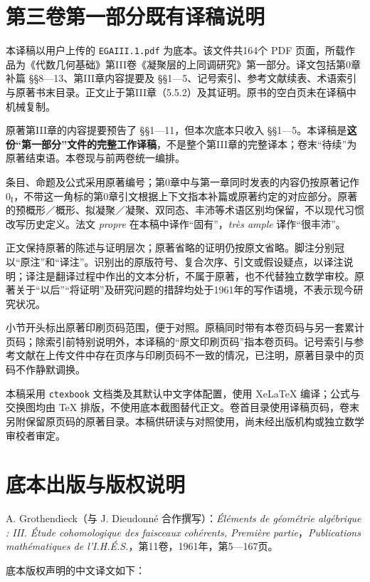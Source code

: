\chapter*{第三卷第一部分既有译稿说明}
本译稿以用户上传的 \texttt{EGAIII.1.pdf} 为底本。该文件共164个 PDF 页面，所载作品为《代数几何基础》第III卷《凝聚层的上同调研究》第一部分。译文包括第0章补篇 §§8—13、第III章内容提要及 §§1—5、记号索引、参考文献续表、术语索引与原著书末目录。正文止于第III章（5.5.2）及其证明。原书的空白页未在译稿中机械复制。

原著第III章的内容提要预告了 §§1—11，但本次底本只收入 §§1—5。本译稿是\textbf{这份“第一部分”文件的完整工作译稿}，不是整个第III章的完整译本；卷末“待续”为原著结束语。本卷现与前两卷统一编排。

条目、命题及公式采用原著编号；第0章中与第一章同时发表的内容仍按原著记作 $0_{\mathrm I}$，不带这一角标的第0章引文根据上下文指本补篇或原著约定的对应部分。原著的预概形／概形、拟凝聚／凝聚、双同态、丰沛等术语区别均保留，不以现代习惯改写历史定义。法文 \textit{propre} 在本稿中译作“固有”，\textit{très ample} 译作“很丰沛”。

正文保持原著的陈述与证明层次；原著省略的证明仍按原文省略。脚注分别冠以“原注”和“译注”。识别出的原版符号、复合次序、引文或假设疑点，以译注说明；译注是翻译过程中作出的文本分析，不属于原著，也不代替独立数学审校。原著关于“以后”“将证明”及研究问题的措辞均处于1961年的写作语境，不表示现今研究状况。

小节开头标出原著印刷页码范围，便于对照。原稿同时带有本卷页码与另一套累计页码；除索引前特别说明外，本译稿的“原文印刷页码”指本卷页码。记号索引与参考文献在上传文件中存在页序与印刷页码不一致的情况，已注明，原著目录中的页码不作静默调换。

本稿采用 \texttt{ctexbook} 文档类及其默认中文字体配置，使用 XeLaTeX 编译；公式与交换图均由 TeX 排版，不使用底本截图替代正文。卷首目录使用译稿页码，卷末另附保留原页码的原著目录。本稿供研读与对照使用，尚未经出版机构或独立数学审校者审定。

\chapter*{底本出版与版权说明}
A. Grothendieck（与 J. Dieudonné 合作撰写）：\textit{Éléments de géométrie algébrique : III. Étude cohomologique des faisceaux cohérents, Première partie}，\textit{Publications mathématiques de l'I.H.É.S.}，第11卷，1961年，第5—167页。

底本版权声明的中文译文如下：

